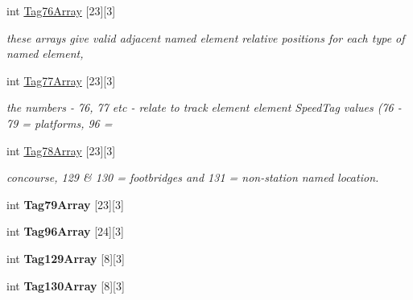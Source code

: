 \begin{DoxyCompactItemize}
\mbox{\label{class_t_track_a8dc657245d548b3b07fdb42e173f3bba}} 
int \mbox{\hyperlink{class_t_track_a8dc657245d548b3b07fdb42e173f3bba}{Tag76\+Array}} \mbox{[}23\mbox{]}\mbox{[}3\mbox{]}
\begin{DoxyCompactList}\small\item\em these arrays give valid adjacent named element relative positions for each type of named element, \end{DoxyCompactList}\item 
\mbox{\label{class_t_track_a4f05f2ae83cb9f85930df970b7844c4b}} 
int \mbox{\hyperlink{class_t_track_a4f05f2ae83cb9f85930df970b7844c4b}{Tag77\+Array}} \mbox{[}23\mbox{]}\mbox{[}3\mbox{]}
\begin{DoxyCompactList}\small\item\em the numbers -\/ 76, 77 etc -\/ relate to track element element Speed\+Tag values (76 -\/ 79 = platforms, 96 = \end{DoxyCompactList}\item 
\mbox{\label{class_t_track_a4b4b28532e1317000b4387a9b37ff981}} 
int \mbox{\hyperlink{class_t_track_a4b4b28532e1317000b4387a9b37ff981}{Tag78\+Array}} \mbox{[}23\mbox{]}\mbox{[}3\mbox{]}
\begin{DoxyCompactList}\small\item\em concourse, 129 \& 130 = footbridges and 131 = non-\/station named location. \end{DoxyCompactList}\item 
\mbox{\label{class_t_track_ab95da137dad09b9c8cd3fc673b80e841}} 
int {\bfseries Tag79\+Array} \mbox{[}23\mbox{]}\mbox{[}3\mbox{]}
\item 
\mbox{\label{class_t_track_a689870b6bccd25e8b8980e363ad646d0}} 
int {\bfseries Tag96\+Array} \mbox{[}24\mbox{]}\mbox{[}3\mbox{]}
\item 
\mbox{\label{class_t_track_ac54feeb3cf1699bde9e4ac88d76d88fb}} 
int {\bfseries Tag129\+Array} \mbox{[}8\mbox{]}\mbox{[}3\mbox{]}
\item 
\mbox{\label{class_t_track_a33e00a86d9cb4b0402c08144f9ab563b}} 
int {\bfseries Tag130\+Array} \mbox{[}8\mbox{]}\mbox{[}3\mbox{]}

\end{DoxyCompactItemize}
